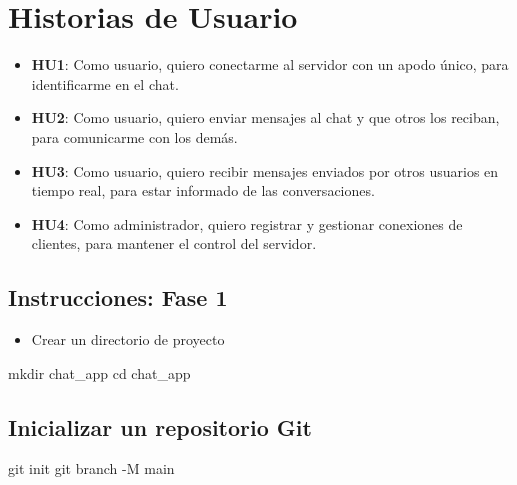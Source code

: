 \documentclass[
  a4paper,
  DIV=11,
  numbers=noendperiod,
  onepage,
  openany]{scrreprt}
\newenvironment{Shaded}{\begin{snugshade}}{\end{snugshade}}
\newcommand{\AttributeTok}[1]{\textcolor[rgb]{0.40,0.45,0.13}{#1}}
\newcommand{\BuiltInTok}[1]{\textcolor[rgb]{0.00,0.23,0.31}{#1}}
\newcommand{\FunctionTok}[1]{\textcolor[rgb]{0.28,0.35,0.67}{#1}}
\newcommand{\NormalTok}[1]{\textcolor[rgb]{0.00,0.23,0.31}{#1}}
\providecommand{\tightlist}{%
  \setlength{\itemsep}{0pt}\setlength{\parskip}{0pt}}\usepackage{longtable,booktabs,array}
\begin{document}
\section{Historias de Usuario}\label{historias-de-usuario-1}

\begin{itemize}
\tightlist
\item
  \textbf{HU1}: Como usuario, quiero conectarme al servidor con un apodo
  único, para identificarme en el chat.
\item
  \textbf{HU2}: Como usuario, quiero enviar mensajes al chat y que otros
  los reciban, para comunicarme con los demás.
\item
  \textbf{HU3}: Como usuario, quiero recibir mensajes enviados por otros
  usuarios en tiempo real, para estar informado de las conversaciones.
\item
  \textbf{HU4}: Como administrador, quiero registrar y gestionar
  conexiones de clientes, para mantener el control del servidor.
\end{itemize}

\subsection{Instrucciones: Fase 1}\label{instrucciones-fase-1}

\begin{itemize}
\tightlist
\item
  Crear un directorio de proyecto
\end{itemize}

\begin{Shaded}
\begin{Highlighting}[]
\FunctionTok{mkdir}\NormalTok{ chat\_app}
\BuiltInTok{cd}\NormalTok{ chat\_app}
\end{Highlighting}
\end{Shaded}

\subsection{Inicializar un repositorio
Git}\label{inicializar-un-repositorio-git}

\begin{Shaded}
\begin{Highlighting}[]
\FunctionTok{git}\NormalTok{ init}
\FunctionTok{git}\NormalTok{ branch }\AttributeTok{{-}M}\NormalTok{ main}
\end{Highlighting}
\end{Shaded}
\end{document}

